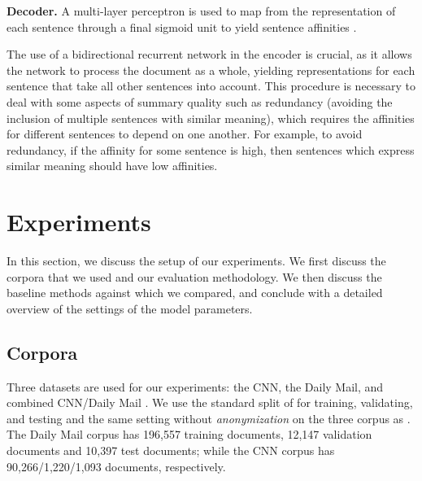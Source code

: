 \documentclass[11pt,a4paper]{article}
\begin{document}
\noindent \textbf{Decoder.} A multi-layer perceptron is used to map from the representation  of each sentence through a final sigmoid unit to yield sentence affinities .

The use of a bidirectional recurrent network in the encoder is crucial, as it allows the network to process the document as a whole, yielding representations for each sentence that take all other sentences into account. This procedure is necessary to deal with some aspects of summary quality such as redundancy (avoiding the inclusion of multiple sentences with similar meaning), which requires the affinities for different sentences to depend on one another. For example, to avoid redundancy, if the affinity for some sentence is high, then sentences which express similar meaning should have low affinities.




















\section{Experiments\label{sec:experiments}}
In this section, we discuss the setup of our experiments. We first discuss the corpora that we used and our evaluation methodology. We then discuss the baseline methods against which we compared, and conclude with a detailed overview of the settings of  the model parameters. 
\subsection{Corpora}
Three datasets are used for our experiments: the CNN, the Daily Mail, and combined CNN/Daily Mail \citep{data1_hermann2015teaching,data2_nallapati2016abstractive}. We use the standard split of \citet{data1_hermann2015teaching} for training, validating, and testing and the same setting without \textit{anonymization} on the three corpus as \citet{abs4_SeeLM17}. The Daily Mail corpus has 196,557 training documents, 12,147 validation documents and 10,397 test documents; while the CNN corpus has 90,266/1,220/1,093 documents, respectively. 
\end{document}
